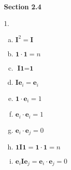 \documentclass[letterpaper,fleqn]{article}
\begin{document}
	\newcommand{\sect}[2]{
		\noindent\textbf{Section #1}
		\begin{enumerate}
			#2
		\end{enumerate}
	}
	
	\newcommand{\ques}[3][\quad] {
		\begin{minipage}{\textwidth}
			\item [#2.] #1
			#3
		\end{minipage}\\
	}
	
	\sect{2.4}{
		\ques{1}{
			\begin{enumerate}[(a)]
				\item 
				$\textbf{I}^2=\textbf{I}$
				\item 
				$\textbf{1} \cdot \textbf{1}=n$
				\item 
				$\textbf{I1}=\textbf{1}$
				\item 
				$\textbf{Ie}_i=\textbf{e}_i$
				\item 
				$\textbf{1} \cdot \textbf{e}_i=1$
				\item 
				$\textbf{e}_i \cdot \textbf{e}_i=1$
				\item 
				$\textbf{e}_i \cdot \textbf{e}_j=0$
				\item 
				$\textbf{1I1}=\textbf{1} \cdot \textbf{1}=n$
				\item 
				$\textbf{e}_i\textbf{Ie}_j=\textbf{e}_i \cdot \textbf{e}_j=0$
			\end{enumerate}
		}	
		
}
\end{document}
